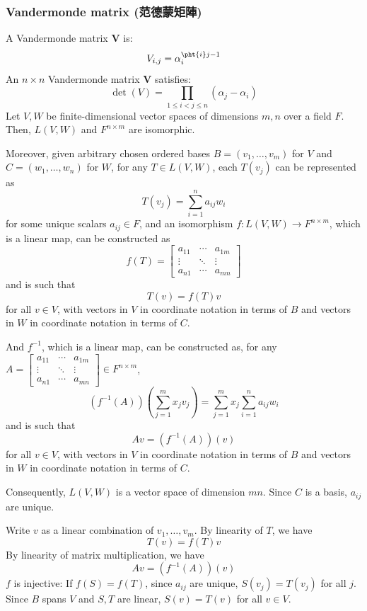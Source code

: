 \documentclass[a4paper,12pt]{report}
\begin{document}
\subsubsection{Vandermonde matrix (范德蒙矩陣)}
A Vandermonde matrix $\mathbf{V}$ is:
\[V_{i,j}=\alpha_i^{\pht{i}j-1}\]
An $n\times n$ Vandermonde matrix $\mathbf{V}$ satisfies:
\[\det(V)=\prod _{1\leq i<j\leq n}(\alpha _{j}-\alpha _{i})\]
Let $V,W$ be finite-dimensional vector spaces of dimensions $m,n$ over a field $F$. Then, $L(V,W)$ and $F^{n\times m}$ are isomorphic.

Moreover, given arbitrary chosen ordered bases $B=(v_1,\ldots,v_m)$ for $V$ and $C=(w_1,\ldots,w_n)$ for $W$, for any $T\in L(V,W)$, each $T(v_j)$ can be represented as
\[T(v_j)=\sum_{i=1}^na_{ij}w_i\]
for some unique scalars $a_{ij}\in F$, and an isomorphism $f\colon L(V,W)\to F^{n\times m}$, which is a linear map, can be constructed as
\[f(T)=\begin{bmatrix}a_{11}&\cdots&a_{1m}\\\vdots&\ddots&\vdots\\a_{n1}&\cdots&a_{mn}\end{bmatrix}\]
and is such that
\[T(v)=f(T)v\]
for all $v\in V$, with vectors in $V$ in coordinate notation in terms of $B$ and vectors in $W$ in coordinate notation in terms of $C$.

And $f^{-1}$, which is a linear map, can be constructed as, for any $A=\begin{bmatrix}a_{11}&\cdots&a_{1m}\\\vdots&\ddots&\vdots\\a_{n1}&\cdots&a_{mn}\end{bmatrix}\in F^{n\times m}$,
\[(f^{-1}(A))(\sum_{j=1}^mx_jv_j)=\sum_{j=1}^mx_j\sum_{i=1}^na_{ij}w_i\]
and is such that
\[Av=(f^{-1}(A))(v)\]
for all $v\in V$, with vectors in $V$ in coordinate notation in terms of $B$ and vectors in $W$ in coordinate notation in terms of $C$.

Consequently, $L(V,W)$ is a vector space of dimension $mn$.
\bpr
Since $C$ is a basis, $a_{ij}$ are unique.

Write $v$ as a linear combination of $v_1,\ldots,v_m$. By linearity of $T$, we have
\[T(v)=f(T)v\]
By linearity of matrix multiplication, we have
\[Av=(f^{-1}(A))(v)\]
$f$ is injective: If $f(S)=f(T)$, since $a_{ij}$ are unique, $S(v_j)=T(v_j)$ for all $j$. Since $B$ spans $V$ and $S,T$ are linear, $S(v)=T(v)$ for all $v\in V$.
\end{document}
